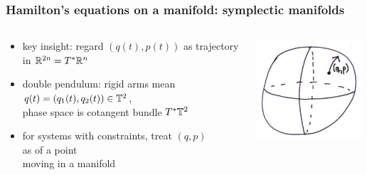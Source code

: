 \begin{frame}
  \frametitle{Hamilton's equations on a manifold: symplectic manifolds}
  \begin{columns}
    \begin{column}{0.72\textwidth}
      \begin{itemize}
        \item key insight: regard $(q(t), p(t))$ as trajectory\\in {} $\mathbb{R}^{2n} = T^\ast \mathbb{R}^n$

        \item double pendulum: rigid arms  mean\\
        $q(t)=(q_1(t),q_2(t))\in \mathbb{T}^{2}$,\\phase space is cotangent bundle $T^\ast \mathbb{T}^{2}$

        \item for systems with constraints, treat $(q,p)$\\as {} of a point\\moving in a manifold
      \end{itemize}
    \end{column}
    \begin{column}{0.3\textwidth}
      \hspace{-6mm}\mbox{\includegraphics[width=3.9cm]{images/phase_space.jpg}}
    \end{column}
  \end{columns}


\end{frame}
